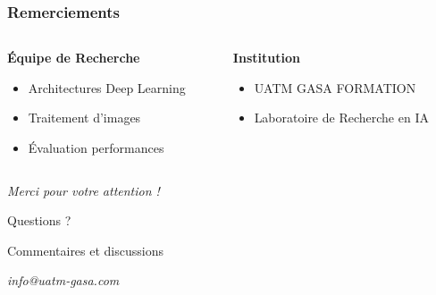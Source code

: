 \documentclass[
	11pt,
	aspectratio=169,
]{beamer}
\begin{document}

\begin{frame}
	\frametitle{Remerciements}
	
	\begin{columns}[t]
		\begin{column}{0.45\textwidth}
			\textbf{Équipe de Recherche}
			\begin{itemize}
				\item Architectures Deep Learning
				\item Traitement d'images
				\item Évaluation performances
			\end{itemize}
		\end{column}
		
		\begin{column}{0.5\textwidth}
			\textbf{Institution}
			\begin{itemize}
				\item UATM GASA FORMATION
				\item Laboratoire de Recherche en IA
			\end{itemize}
		\end{column}
	\end{columns}
	
	\bigskip\bigskip
	
	\centering
	\textit{Merci pour votre attention !}
\end{frame}


\begin{frame}[plain]
	\begin{center}
		{\Huge Questions ?}
		
		\bigskip\bigskip
		
		{\LARGE Commentaires et discussions}
		
		\bigskip\bigskip
		
		\textit{info@uatm-gasa.com}
	\end{center}
\end{frame}

\end{document}
